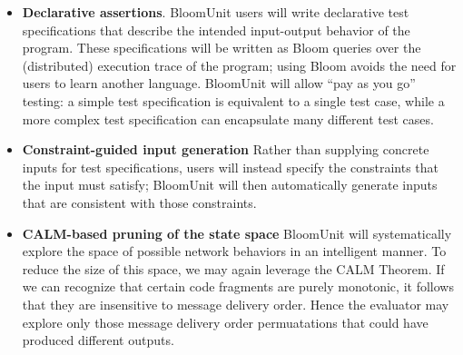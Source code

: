 \begin{itemize}
\item \textbf{Declarative assertions}.
BloomUnit users will write declarative test specifications that describe the 
intended input-output behavior of the program. These specifications will be 
written 
as Bloom queries over the (distributed) execution trace of the program; 
using Bloom avoids the need for users to learn another language. 
BloomUnit will allow ``pay as you go'' testing: a simple test specification 
is equivalent to a single test case, while a more complex test specification 
can encapsulate many different test cases.


\item \textbf{Constraint-guided input generation}
Rather than supplying concrete inputs for test specifications, users will 
instead 
specify the constraints that the input must satisfy; BloomUnit will then 
automatically generate inputs that are consistent with those constraints.

\item \textbf{CALM-based pruning of the state space}
BloomUnit will systematically explore the space of
possible network behaviors in an intelligent manner. To reduce the size of this space, we may again
leverage the CALM Theorem.
If we can recognize that certain code fragments are purely monotonic, it follows 
that they are insensitive to message delivery order.
Hence the evaluator may explore only those message delivery order permuatations
that could have produced different outputs.
\end{itemize}

